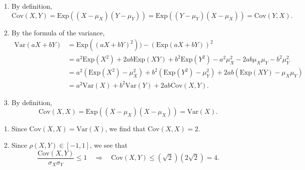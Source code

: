 \begin{problem}
    \begin{enumerate}[label=\alph*)]
        \item By definition,
            \[
                \mathrm{Cov} (X, Y) = \mathrm{Exp} ( (X -\mu_X) (Y - \mu_Y)) = \mathrm{Exp} ( (Y- \mu_Y) (X - \mu_X )) = \mathrm{Cov} (Y, X) .
            \]
        \item By the formula of the variance,
            \begin{align*}
                \mathrm{Var} (aX + bY) &= \mathrm{Exp} ( (aX + bY)^2)) - (\mathrm{Exp} (aX + bY))^2 \\ 
                &= a^2 \mathrm{Exp} (X^2) + 2ab \mathrm{Exp} (XY) + b^2 \mathrm{Exp} (Y^2) - a^2\mu_X^2 - 2ab \mu_X \mu_Y - b^2 \mu_Y^2 \\ 
                &= a^2 (\mathrm{Exp} (X^2) - \mu_X^2) + b^2 (\mathrm{Exp} (Y^2) - \mu_Y^2) + 2ab (\mathrm{Exp} (XY) - \mu_X \mu_Y ) \\ 
                &= a^2 \mathrm{Var} (X) + b^2 \mathrm{Var} (Y) + 2ab \mathrm{Cov} (X, Y) . 
            \end{align*} 
        \item By definition,
            \[
                \mathrm{Cov} (X, X) = \mathrm{Exp} ( (X - \mu_X) (X - \mu_X )) = \mathrm{Var} (X) . \tag*{$\square$}
            \]
    \end{enumerate}
\end{problem}

\begin{problem}
    \begin{enumerate}[label=\alph*)]
            \item Since $\mathrm{Cov} (X, X) = \mathrm{Var} (X)$, we find that $\mathrm{Cov} (X, X) = 2$. 
            \item Since $\rho (X, Y) \in [-1, 1]$, we see that
                \[
                    \frac{\mathrm{Cov} (X, Y)}{\sigma_X \sigma_Y} \leq 1 \quad \Rightarrow \quad \mathrm{Cov} (X, Y) \leq (\sqrt{2}) (2\sqrt{2}) = 4 . \tag*{$\square$}
                \]
    \end{enumerate}
\end{problem}

